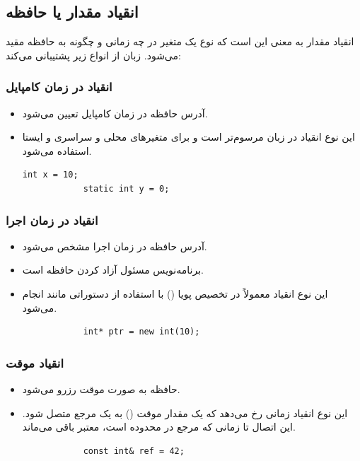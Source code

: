 \documentclass[12pt, a4paper]{report}
\begin{document}
\subsection{انقیاد مقدار یا حافظه}
انقیاد مقدار به معنی این است که نوع یک متغیر در چه زمانی و چگونه به حافظه مقید می‌‌شود. 
زبان از انواع زیر پشتیبانی می‌کند:


\subsubsection{انقیاد در زمان کامپایل}
\begin{itemize}
	\item آدرس حافظه در زمان کامپایل تعیین می‌شود.
	\item این نوع انقیاد در زبان مرسوم‌‌تر است و برای متغیر‌های محلی و سراسری و ایستا استفاده می‌شود.
	
	\begin{LTR} %
		\begin{lstlisting}[breaklines=true]
			int x = 10;
			static int y = 0;
		\end{lstlisting}
	\end{LTR}
\end{itemize}


\subsubsection{انقیاد در زمان اجرا}
\begin{itemize}
	\item آدرس حافظه در زمان اجرا مشخص می‌شود.
	\item برنامه‌نویس مسئول آزاد کردن حافظه است.
	\item این نوع انقیاد معمولاً در تخصیص پویا () با استفاده از دستوراتی مانند  انجام می‌شود.
	
	
	\begin{LTR} %
		\begin{lstlisting}
			int* ptr = new int(10);
		\end{lstlisting}
	\end{LTR}
\end{itemize}


\subsubsection{انقیاد موقت}
\begin{itemize}
	\item حافظه به صورت موقت رزرو می‌شود.
	\item این نوع انقیاد زمانی رخ می‌دهد که یک مقدار موقت () به یک مرجع متصل شود. این اتصال تا زمانی که مرجع در محدوده است، معتبر باقی می‌ماند.
	
	
	\begin{LTR} %
		\begin{lstlisting}
			const int& ref = 42;
		\end{lstlisting}
	\end{LTR}
\end{itemize}
\end{document}

